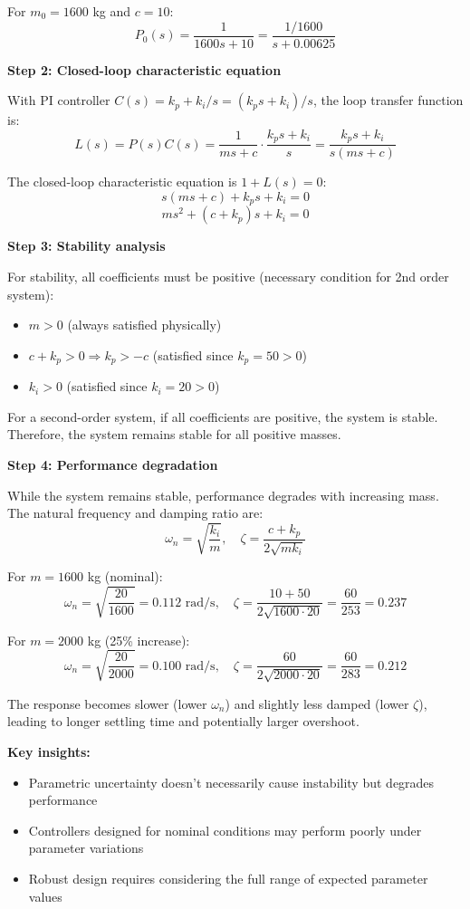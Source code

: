 \documentclass[11pt,a4paper]{article}
\begin{document}
For $m_0 = 1600$ kg and $c = 10$:
\[
P_0(s) = \frac{1}{1600s + 10} = \frac{1/1600}{s + 0.00625}
\]

\textbf{Step 2: Closed-loop characteristic equation}

With PI controller $C(s) = k_p + k_i/s = (k_ps + k_i)/s$, the loop transfer function is:
\[
L(s) = P(s)C(s) = \frac{1}{ms + c} \cdot \frac{k_ps + k_i}{s} = \frac{k_ps + k_i}{s(ms + c)}
\]

The closed-loop characteristic equation is $1 + L(s) = 0$:
\[
s(ms + c) + k_ps + k_i = 0
\]
\[
ms^2 + (c + k_p)s + k_i = 0
\]

\textbf{Step 3: Stability analysis}

For stability, all coefficients must be positive (necessary condition for 2nd order system):
\begin{itemize}
\item $m > 0$ (always satisfied physically)
\item $c + k_p > 0 \Rightarrow k_p > -c$ (satisfied since $k_p = 50 > 0$)
\item $k_i > 0$ (satisfied since $k_i = 20 > 0$)
\end{itemize}

For a second-order system, if all coefficients are positive, the system is stable. Therefore, the system remains stable for all positive masses.

\textbf{Step 4: Performance degradation}

While the system remains stable, performance degrades with increasing mass. The natural frequency and damping ratio are:
\[
\omega_n = \sqrt{\frac{k_i}{m}}, \quad \zeta = \frac{c + k_p}{2\sqrt{mk_i}}
\]

For $m = 1600$ kg (nominal):
\[
\omega_n = \sqrt{\frac{20}{1600}} = 0.112 \text{ rad/s}, \quad \zeta = \frac{10 + 50}{2\sqrt{1600 \cdot 20}} = \frac{60}{253} = 0.237
\]

For $m = 2000$ kg (25\% increase):
\[
\omega_n = \sqrt{\frac{20}{2000}} = 0.100 \text{ rad/s}, \quad \zeta = \frac{60}{2\sqrt{2000 \cdot 20}} = \frac{60}{283} = 0.212
\]

The response becomes slower (lower $\omega_n$) and slightly less damped (lower $\zeta$), leading to longer settling time and potentially larger overshoot.

\textbf{Key insights:}
\begin{itemize}
\item Parametric uncertainty doesn't necessarily cause instability but degrades performance
\item Controllers designed for nominal conditions may perform poorly under parameter variations
\item Robust design requires considering the full range of expected parameter values
\end{itemize}
\end{document}
